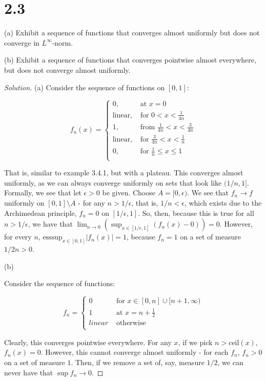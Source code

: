 \documentclass[10pt]{article}
\newenvironment{problem}[2][Problem]{\begin{trivlist}
\item[\hskip \labelsep {\bfseries #1}\hskip \labelsep {\bfseries #2.}]}{\end{trivlist}}
\begin{document}
\section*{2.3}

\begin{problem}{3.4.6}
(a) Exhibit a sequence of functions that converges almost uniformly but does not converge in $L^\infty$-norm.

(b) Exhibit a sequence of functions that converges pointwise almost everywhere, but does not converge almost uniformly.
\end{problem}
\begin{proof}[Solution]
(a)
Consider the sequence of functions on $[0,1]$:

$$ f_n(x) = \begin{cases} 0, & \text{ at } x= 0 \\
\text{linear}, & \text{ for } 0 < x < \frac{1}{4n} \\
1, & \text{ from } \frac{1}{4n} <  x < \frac{3}{4n} \\
\text{linear}, & \text{ for } \frac{3}{4n} < x < \frac{1}{n} \\
0, & \text{ for } \frac{1}{n} \leq x \leq 1 \\
\end{cases} $$

That is, similar to example 3.4.1, but with a plateau. This converges almost uniformly, as we can always converge uniformly on sets that look like $(1/n,1]$. Formally, we see that let $\epsilon > 0$ be given. Choose $A = [0,\epsilon)$. We see that $f_n \to f$ uniformly on $[0,1] \setminus A$ - for any $n > 1/\epsilon$, that is, $1/n < \epsilon$, which exists due to the Archimedean principle, $f_n = 0$ on $[1/\epsilon,1]$. So, then, because this is true for all $n > 1/\epsilon$, we have that $\lim_{n \to 0}( \sup_{x \in [1/\epsilon,1]} (f_n(x) - 0) )  = 0$. However, for every $n$, $\text{esssup}_{x \in [0,1]} | f_n(x) |  = 1$, because $f_n = 1$ on a set of measure $1/2n > 0$.

(b)

Consider the sequence of functions:

$$ f_n = \begin{cases} 0 & \text { for } x \in [0,n] \cup [n+1,\infty) \\
1 & \text{ at } x = n + \frac{1}{2} \\
linear & \text { otherwise }\\ \end{cases} $$ 

Clearly, this converges pointwise everywhere. For any $x$, if we pick $n > \text{ceil}(x)$, $f_n(x) = 0$. However, this cannot converge almost uniformly - for each $f_n$, $f_n > 0$ on a set of measure $1$. Then, if we remove a set of, say, measure $1/2$, we can never have that $\sup f_n \to 0$.
\end{proof}
\end{document}
